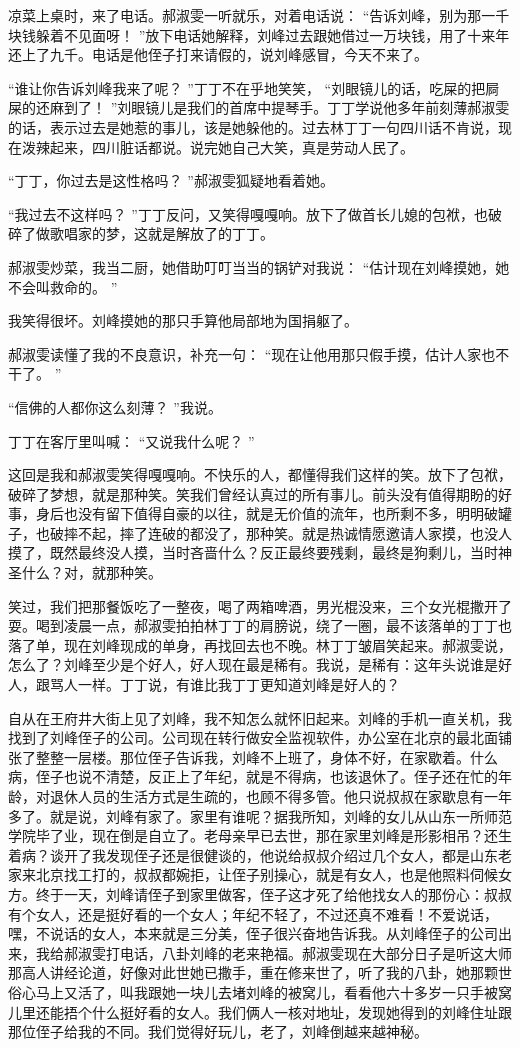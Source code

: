 \documentclass[12pt,twoside,openany]{book}
\begin{document}
凉菜上桌时，来了电话。郝淑雯一听就乐，对着电话说： “告诉刘峰，别为那一千块钱躲着不见面呀！ ”放下电话她解释，刘峰过去跟她借过一万块钱，用了十来年还上了九千。电话是他侄子打来请假的，说刘峰感冒，今天不来了。

“谁让你告诉刘峰我来了呢？ ”丁丁不在乎地笑笑， “刘眼镜儿的话，吃屎的把屙屎的还麻到了！ ”刘眼镜儿是我们的首席中提琴手。丁丁学说他多年前刻薄郝淑雯的话，表示过去是她惹的事儿，该是她躲他的。过去林丁丁一句四川话不肯说，现在泼辣起来，四川脏话都说。说完她自己大笑，真是劳动人民了。

“丁丁，你过去是这性格吗？ ”郝淑雯狐疑地看着她。

“我过去不这样吗？ ”丁丁反问，又笑得嘎嘎响。放下了做首长儿媳的包袱，也破碎了做歌唱家的梦，这就是解放了的丁丁。

郝淑雯炒菜，我当二厨，她借助叮叮当当的锅铲对我说： “估计现在刘峰摸她，她不会叫救命的。 ”

我笑得很坏。刘峰摸她的那只手算他局部地为国捐躯了。

郝淑雯读懂了我的不良意识，补充一句： “现在让他用那只假手摸，估计人家也不干了。 ”

“信佛的人都你这么刻薄？ ”我说。

丁丁在客厅里叫喊： “又说我什么呢？ ”

这回是我和郝淑雯笑得嘎嘎响。不快乐的人，都懂得我们这样的笑。放下了包袱，破碎了梦想，就是那种笑。笑我们曾经认真过的所有事儿。前头没有值得期盼的好事，身后也没有留下值得自豪的以往，就是无价值的流年，也所剩不多，明明破罐子，也破摔不起，摔了连破的都没了，那种笑。就是热诚情愿邀请人家摸，也没人摸了，既然最终没人摸，当时吝啬什么？反正最终要残剩，最终是狗剩儿，当时神圣什么？对，就那种笑。

笑过，我们把那餐饭吃了一整夜，喝了两箱啤酒，男光棍没来，三个女光棍撒开了耍。喝到凌晨一点，郝淑雯拍拍林丁丁的肩膀说，绕了一圈，最不该落单的丁丁也落了单，现在刘峰现成的单身，再找回去也不晚。林丁丁皱眉笑起来。郝淑雯说，怎么了？刘峰至少是个好人，好人现在最是稀有。我说，是稀有：这年头说谁是好人，跟骂人一样。丁丁说，有谁比我丁丁更知道刘峰是好人的？

自从在王府井大街上见了刘峰，我不知怎么就怀旧起来。刘峰的手机一直关机，我找到了刘峰侄子的公司。公司现在转行做安全监视软件，办公室在北京的最北面铺张了整整一层楼。那位侄子告诉我，刘峰不上班了，身体不好，在家歇着。什么病，侄子也说不清楚，反正上了年纪，就是不得病，也该退休了。侄子还在忙的年龄，对退休人员的生活方式是生疏的，也顾不得多管。他只说叔叔在家歇息有一年多了。就是说，刘峰有家了。家里有谁呢？据我所知，刘峰的女儿从山东一所师范学院毕了业，现在倒是自立了。老母亲早已去世，那在家里刘峰是形影相吊？还生着病？谈开了我发现侄子还是很健谈的，他说给叔叔介绍过几个女人，都是山东老家来北京找工打的，叔叔都婉拒，让侄子别操心，就是有女人，也是他照料伺候女方。终于一天，刘峰请侄子到家里做客，侄子这才死了给他找女人的那份心：叔叔有个女人，还是挺好看的一个女人；年纪不轻了，不过还真不难看！不爱说话，嘿，不说话的女人，本来就是三分美，侄子很兴奋地告诉我。从刘峰侄子的公司出来，我给郝淑雯打电话，八卦刘峰的老来艳福。郝淑雯现在大部分日子是听这大师那高人讲经论道，好像对此世她已撒手，重在修来世了，听了我的八卦，她那颗世俗心马上又活了，叫我跟她一块儿去堵刘峰的被窝儿，看看他六十多岁一只手被窝儿里还能捂个什么挺好看的女人。我们俩人一核对地址，发现她得到的刘峰住址跟那位侄子给我的不同。我们觉得好玩儿，老了，刘峰倒越来越神秘。
\end{document}
